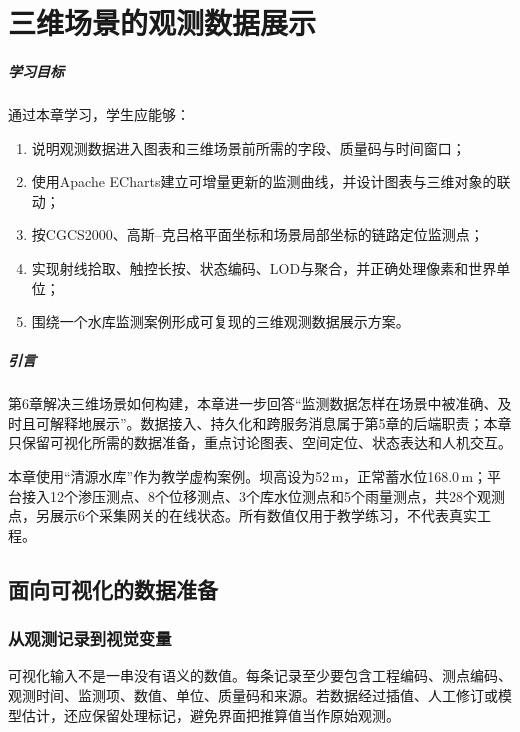 \chapter{三维场景的观测数据展示}

\paragraph*{学习目标}

通过本章学习，学生应能够：

\begin{enumerate}
\item 说明观测数据进入图表和三维场景前所需的字段、质量码与时间窗口；
\item 使用Apache ECharts建立可增量更新的监测曲线，并设计图表与三维对象的联动；
\item 按CGCS2000、高斯--克吕格平面坐标和场景局部坐标的链路定位监测点；
\item 实现射线拾取、触控长按、状态编码、LOD与聚合，并正确处理像素和世界单位；
\item 围绕一个水库监测案例形成可复现的三维观测数据展示方案。
\end{enumerate}

\paragraph*{引言}

第6章解决三维场景如何构建，本章进一步回答“监测数据怎样在场景中被准确、及时且可解释地展示”。数据接入、持久化和跨服务消息属于第5章的后端职责；本章只保留可视化所需的数据准备，重点讨论图表、空间定位、状态表达和人机交互。

本章使用“清源水库”作为教学虚构案例。坝高设为52\,m，正常蓄水位168.0\,m；平台接入12个渗压测点、8个位移测点、3个库水位测点和5个雨量测点，共28个观测点，另展示6个采集网关的在线状态。所有数值仅用于教学练习，不代表真实工程。

\section{面向可视化的数据准备}\label{sec:data-types-display}

\subsection{从观测记录到视觉变量}

可视化输入不是一串没有语义的数值。每条记录至少要包含工程编码、测点编码、观测时间、监测项、数值、单位、质量码和来源。若数据经过插值、人工修订或模型估计，还应保留处理标记，避免界面把推算值当作原始观测。

